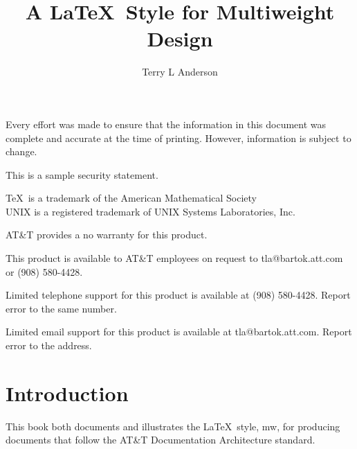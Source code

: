 \author{Terry L Anderson}
\title{A \LaTeX\ Style for Multiweight Design}
\def\LaTeXnine{{\rm L\kern-.36em\raise.3ex\hbox{\tiny A}\kern-.15em
    T\kern-.1667em\lower.7ex\hbox{E}\kern-.125emX}}

\maketitle
\begin{copyrightpage}
  \begin{notice}
    Every effort was made to ensure that the information in this document
    was complete and accurate at the time of printing.  However,
    information is subject to change.
  \end{notice}
  \begin{security}
    This is a sample security statement.
  \end{security}
  \begin{trademarks}
    \TeX\ is a trademark of the American Mathematical Society\\
    UNIX is a registered trademark of UNIX Systems Laboratories, Inc.
  \end{trademarks}
  \begin{warranty}
    AT\&T provides a no warranty for this product.  
  \end{warranty}
  \begin{orderinginfo}
    This product is available to AT\&T employees on request to
    tla@bartok.att.com or (908) 580-4428.
  \end{orderinginfo}
  \begin{telephonesupport}
    Limited telephone support for this product is available at (908)
    580-4428.  Report error to the same number.
  \end{telephonesupport}
  \begin{emailsupport}
    Limited email support for this product is available at
    tla@bartok.att.com. Report error to the address.
  \end{emailsupport}
\end{copyrightpage}
\chapter{Introduction}
This book both documents and illustrates the \LaTeX\ style, mw, for
producing documents that follow the AT\&T Documentation Architecture
standard. 

